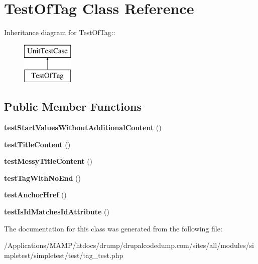\hypertarget{class_test_of_tag}{
\section{TestOfTag Class Reference}
\label{class_test_of_tag}
}
Inheritance diagram for TestOfTag::\begin{figure}[H]
\begin{center}
\leavevmode
\includegraphics[height=2cm]{class_test_of_tag}
\end{center}
\end{figure}
\subsection*{Public Member Functions}
\begin{DoxyCompactItemize}
\item 
\hypertarget{class_test_of_tag_afe0b18ba2c119b8e1c3af20843f81f32}{
{\bfseries testStartValuesWithoutAdditionalContent} ()}
\label{class_test_of_tag_afe0b18ba2c119b8e1c3af20843f81f32}

\item 
\hypertarget{class_test_of_tag_aa923963280375e12397f908d260bbd33}{
{\bfseries testTitleContent} ()}
\label{class_test_of_tag_aa923963280375e12397f908d260bbd33}

\item 
\hypertarget{class_test_of_tag_a641ef5f11c8f903c6d3a81b4f36cec9c}{
{\bfseries testMessyTitleContent} ()}
\label{class_test_of_tag_a641ef5f11c8f903c6d3a81b4f36cec9c}

\item 
\hypertarget{class_test_of_tag_af94e9901470e23940b044fab011f00af}{
{\bfseries testTagWithNoEnd} ()}
\label{class_test_of_tag_af94e9901470e23940b044fab011f00af}

\item 
\hypertarget{class_test_of_tag_a0ca3e2f749b386b733f9f92d38923e33}{
{\bfseries testAnchorHref} ()}
\label{class_test_of_tag_a0ca3e2f749b386b733f9f92d38923e33}

\item 
\hypertarget{class_test_of_tag_a8436c8b34806e6b0369ef061e35ee8c6}{
{\bfseries testIsIdMatchesIdAttribute} ()}
\label{class_test_of_tag_a8436c8b34806e6b0369ef061e35ee8c6}

\end{DoxyCompactItemize}


The documentation for this class was generated from the following file:\begin{DoxyCompactItemize}
\item 
/Applications/MAMP/htdocs/drump/drupalcodedump.com/sites/all/modules/simpletest/simpletest/test/tag\_\-test.php\end{DoxyCompactItemize}
